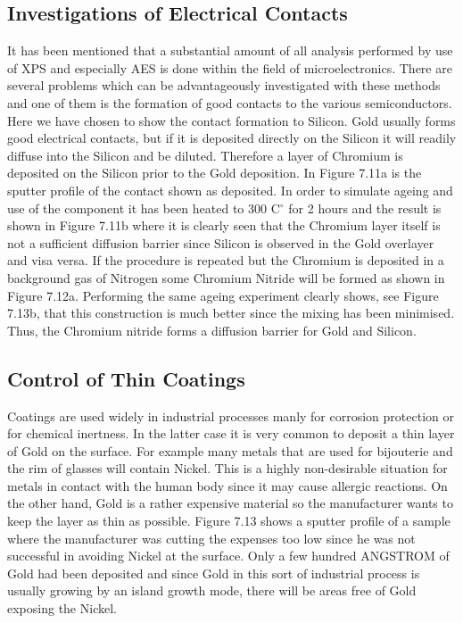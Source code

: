  \subsection{Investigations of Electrical Contacts}
 It has been mentioned that a substantial amount of all
 analysis performed by use of XPS and especially AES is done
 within the field of microelectronics. There are several
 problems which can be advantageously investigated with these
 methods and one of them is the formation of good contacts to
 the various semiconductors. Here we have chosen to show the
 contact formation to Silicon. Gold usually forms good
 electrical contacts, but if it is deposited directly on the
 Silicon it will readily diffuse into the Silicon and be diluted.
 Therefore a layer of Chromium is deposited on the Silicon
 prior to the Gold deposition. In Figure 7.11a is the
 sputter profile of the contact shown as deposited. In order
 to simulate ageing and use of the component it has been
 heated to 300 C$^{\circ}$ for 2 hours and the result is shown
 in Figure 7.11b where it is clearly seen that the Chromium
 layer itself is not a sufficient diffusion barrier since
 Silicon is observed in the Gold overlayer and visa versa.
 If the procedure is repeated but the Chromium is deposited
 in a background gas of Nitrogen some Chromium Nitride will
 be formed as shown in Figure 7.12a. Performing the same
 ageing experiment clearly shows, see Figure 7.13b, that this
 construction is much better since the mixing has been
 minimised. Thus, the Chromium nitride forms a diffusion
 barrier for Gold and Silicon.

 \subsection{Control of Thin Coatings}

 Coatings are used widely in industrial processes manly for
 corrosion protection or for chemical inertness. In the
 latter case it is very common to deposit a thin layer of
 Gold on the surface. For example many metals that are
 used for bijouterie and the rim of glasses will contain
 Nickel. This is a highly non-desirable situation for metals
 in contact with the human body since it may cause allergic
 reactions. On the other hand, Gold is a rather expensive
 material so the manufacturer wants to keep the layer as thin
 as possible. Figure 7.13 shows a sputter profile of a sample
 where the manufacturer was cutting the expenses too low since he
 was not successful in avoiding Nickel at the surface.
 Only a few hundred ANGSTROM of Gold had been deposited and since
 Gold in this sort of industrial process is usually growing
 by an island growth mode, there will be areas free of Gold
 exposing the Nickel.

